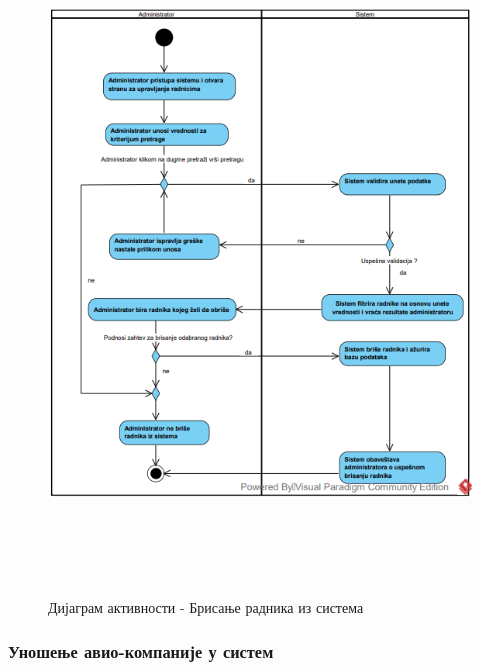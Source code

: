 \documentclass{article}
\begin{document}
\begin{figure}[H]
    \centering
    \includegraphics[width=1.1\textwidth, height=18cm]{Dijagrami_slike/brisanje_radnika.png}
    \caption{Дијаграм активности - Брисање радника из система}
\end{figure}


\subsubsection{Уношење авио-компаније у систем}
\end{document}
